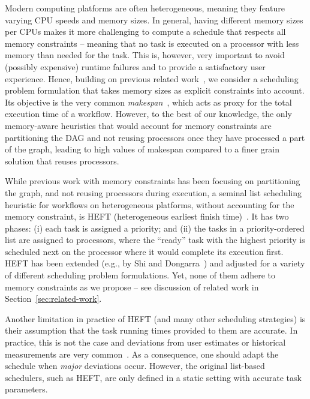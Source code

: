 \documentclass[conference]{IEEEtran}
\newcommand{\skug}[1]{{\color{blue}[SK: #1]}}
\newcommand{\hmey}[1]{{\color{red}[HM: #1]}}
\newcommand{\AB}[1]{{\color{purple}[AB: #1]}}
\begin{document}
    Modern computing platforms are often heterogeneous, meaning they feature varying CPU speeds
    and memory sizes. In general, having different memory sizes per CPUs makes it more challenging to compute
    a schedule that respects all memory constraints -- meaning that no task is executed on a 
    processor with less memory than needed for the task. This is, however, very important to
    avoid (possibly expensive) runtime failures and to provide a satisfactory user experience.
    Hence, building on previous related %
    work~\cite{gou2020partitioning,He21,DBLP:conf/icpp/KulaginaMB24}, we consider a scheduling problem 
    formulation that takes memory sizes as explicit constraints into account. Its objective is
    the very common \emph{makespan}~\cite{liu2018survey}, 
    which acts as proxy for the total execution time of a workflow.
However, to the best of our knowledge,
    the only memory-aware heuristics that would account for memory constraints are  partitioning
    the DAG and not reusing processors once they have processed a part of the graph, leading
    to high values of makespan compared to a finer grain solution that reuses processors. 

    While previous work with memory constraints has been focusing on partitioning the graph, 
    and not reusing processors during execution, 
    a seminal list scheduling heuristic for workflows on heterogeneous platforms, without accounting
    for the memory constraint, is HEFT 
    (heterogeneous earliest finish time)~\cite{topcuoglu2002performance}.
    It has two phases: (i) each task is assigned a priority; and (ii) the tasks in a priority-ordered list are assigned
    to processors, where the ``ready'' task with the highest priority is scheduled next on the processor
    where it would complete its execution first. 
    HEFT has been extended (e.g., by Shi and Dongarra~\cite{SHI2006665}) and adjusted 
    for a variety of different scheduling problem formulations. 
    Yet, none of them adhere to memory constraints as we propose -- see discussion of related work
    in Section~\ref{sec:related-work}. 
        
    Another limitation in practice of HEFT (and many other scheduling strategies) is their 
    assumption that the task running times provided to them are accurate. In practice, this is 
    not the case and deviations from user estimates or historical measurements are 
    very common~\cite{hirales2012multiple}. As a consequence, one should adapt the schedule when \emph{major}
    deviations occur. However, the original list-based schedulers, such as HEFT, are only defined
    in a static setting with accurate task parameters. 
%    
    
\end{document}

